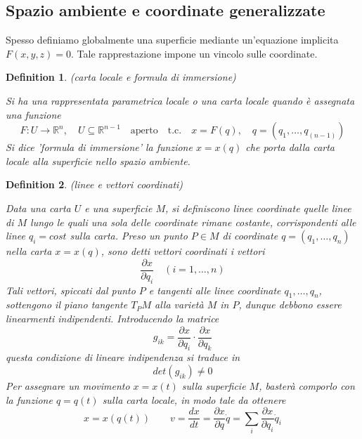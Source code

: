 \documentclass{article}
\newtheorem{definition}{Definition}[section]
\begin{document}
            
        \subsection{Spazio ambiente e coordinate generalizzate}
            
            Spesso definiamo globalmente una superficie mediante un'equazione implicita $F(x, y, z) = 0$. Tale rapprestazione impone un vincolo sulle coordinate. 
            \begin{definition}(carta locale e formula di immersione)

                Si ha una rappresentata parametrica locale o una carta locale quando è assegnata una funzione \[ F: U \rightarrow \mathbb{R}^n, \quad U \subseteq \mathbb{R}^{n - 1} \quad \text{aperto} \quad 
                \text{t.c.} \quad x = F(q), \quad q = (q_1, \dots, q_(n - 1)) \] Si dice 'formula di immersione' la funzione $x = x(q)$ che porta dalla carta locale alla superficie nello spazio ambiente.
                
            \end{definition}

            \begin{definition}(linee e vettori coordinati)

                Data una carta $U$ e una superficie $M$, si definiscono linee coordinate quelle linee di $M$ lungo le quali una sola delle coordinate rimane costante, corrispondenti alle linee $q_i = cost$ sulla carta.
                Preso un punto $P \in M$ di coordinate $q = (q_1, \dots, q_n)$ nella carta $x = x(q)$, sono detti vettori coordinati i vettori \[ \frac{\partial x}{\partial q_i} \quad (i = 1, \dots, n) \]
                Tali vettori, spiccati dal punto $P$ e tangenti alle linee coordinate $q_1, \dots, q_n$, sottengono il piano tangente $T_P M$ alla varietà $M$ in $P$, dunque debbono essere linearmenti indipendenti.
                Introducendo la matrice \[ g_{ik} = \frac{\partial x}{\partial q_i} \cdot \frac{\partial x}{\partial q_k} \] questa condizione di lineare indipendenza si traduce in \[ det(g_{ik}) \neq 0 \]
                Per assegnare un movimento $x = x(t)$ sulla superficie $M$, basterà comporlo con la funzione $q = q(t)$ sulla carta locale, in modo tale da ottenere 
                \[ x = x(q(t)) \quad \quad v = \frac{dx}{dt} = \frac{\partial x}{\partial q} \dot{q} = \sum_i \frac{\partial x}{\partial q_i} \dot{q}_i \] 

            \end{definition}
\end{document}
